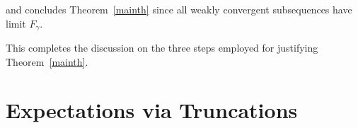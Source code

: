 \documentclass{article}
\numberwithin{equation}{section}
\begin{document}
and concludes Theorem~\ref{mainth} since all weakly convergent subsequences %
 have limit \(F_{\gamma}.\)%
\par
This completes the discussion on the three steps employed for justifying Theorem~\ref{mainth}. 


\section{Expectations via Truncations}\label{sectdetails}
\end{document}
